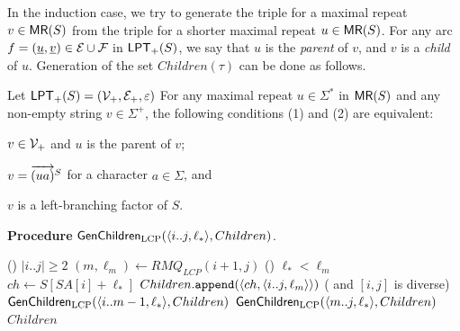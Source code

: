 \documentclass{article}
\begin{document}
In the induction case, we try to generate the triple for a maximal repeat $v\in \MR(S)$ from the triple for a shorter maximal repeat $u\in \MR(S)$.
For any arc $f = (\underline u, \underline v) \in \E\cup\F$ in $\LPT[+](S)$, we say that $u$ is the \textit{parent} of $v$, and $v$ is a \textit{child} of $u$. 
Generation of the set $Children(\tau)$ can be done as follows.


\begin{lemma}\label{lem:maxrep:howto:child}
  Let $\LPT[+](S) = (\sig V_+, \sig E_+, \eps)$
  For any maximal repeat $u \in \Sigma^*$ in $\MR(S)$ and any non-empty string $v \in \Sigma^+$, the following conditions (1) and (2) are equivalent: 
\begin{enumerate*}[(1)]
\item $v \in \sig V_+$ and $u$ is the parent of $v$;  
\item
  \begin{enumerate*}[(i)]
  \item $v = \rext{(ua)}$ for a character $a\in \Sigma$, and 
  \item $v$ is a left-branching factor of $S$. 
  \end{enumerate*}
\end{enumerate*}
\end{lemma}

{
\setlength{\algotitleheightrule}{0pt}%
\begin{algorithm}[h]
  \caption{
    \textbf{Procedure} $\GenChildren(\pair{i..j, \ell_*}, Children)$.  
  }\label{algo:genchildren}
      \If  ()
           {$|i..j| \ge 2$}
      {
        $(m, \ell_m) \gets RMQ_{LCP}(i+1, j)$
        \uIf () {$\ell_* < \ell_m$}{
          $ch \gets S[SA[i]+\ell_*]$
          \label{line:genchildren:compute:ch}
          $Children.\append(\pair{ch, \pair{i..j, \ell_m}})$
        }
        \Else  ( and $[i,j]$ is diverse) 
        {
          $\GenChildren(\pair{i..m-1, \ell_*}, Children)$\; 
          $\GenChildren(\pair{m..j, \ell_*}, Children)$\;
        }
      }
      \Return $Children$\;
\end{algorithm}
}
\end{document}
